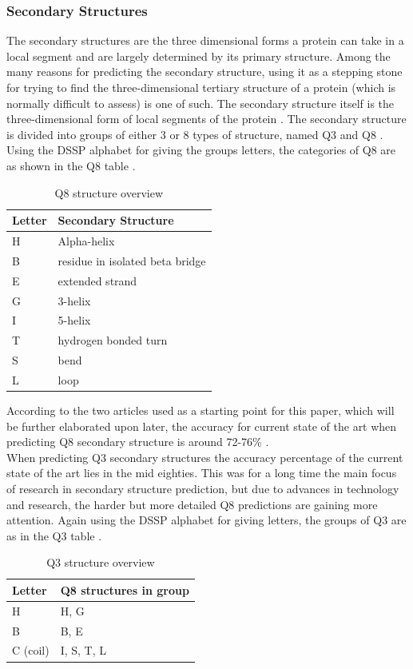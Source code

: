 \subsubsection{Secondary Structures}
The secondary structures are the three dimensional forms a protein can take in a local segment and are largely determined by its primary structure. Among the many reasons for predicting the secondary structure, using it as a stepping stone for trying to find the three-dimensional tertiary structure of a protein (which is normally difficult to assess) is one of such. The secondary structure itself is the three-dimensional form of local segments of the protein \citep[p.~2]{qi-et-al-2012}.
The secondary structure is divided into groups of either 3 or 8 types of structure, named Q3 and Q8 \citep{zhou-and-troyanskaya-2014}. 
Using the DSSP alphabet \citep{kabsch-and-sander-1983} 
for giving the groups letters, the categories of Q8 are as shown in the Q8 table \citep{qi-et-al-2012}.
\begin{table}[H]
\caption{Q8 structure overview}
\centering
\begin{tabular}{l|l}
\hline 
Letter	& Secondary Structure 			\\ \hline
H	& Alpha-helix						\\
B	& residue in isolated beta bridge	\\
E	& extended strand					\\
G	& 3-helix							\\
I	& 5-helix							\\
T	& hydrogen bonded turn				\\
S	& bend								\\
L	& loop								\\
\end{tabular}
\end{table}
\noindent According to the two articles used as a starting point for this paper, which will be further elaborated upon later, the accuracy for current state of the art when predicting Q8 secondary structure is around 72-76\% \citep{zhou-and-troyanskaya-2014, qi-et-al-2012, wang-et-al-2016}. \\
When predicting Q3 secondary structures the accuracy percentage of the current state of the art lies in the mid eighties. This was for a long time the main focus of research in secondary structure prediction, but due to advances in technology and research, the harder but more detailed Q8 predictions are gaining more attention. 
Again using the DSSP alphabet for giving letters, the groups of Q3 are as in the Q3 table \citep{qi-et-al-2012}.
\begin{table}[H]
\caption{Q3 structure overview}
\centering
\begin{tabular}{l|l}
\hline
Letter		& Q8 structures in group	\\ \hline
H			& H, G						\\
B			& B, E						\\
C (coil)	& I, S, T, L				\\
\end{tabular}
\end{table}


